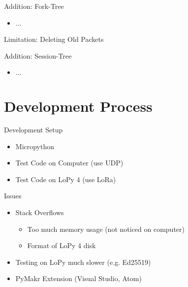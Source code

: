 \documentclass[aspectratio=169]{beamer}
\begin{document}
\begin{frame}[c]{Addition: Fork-Tree}
\begin{itemize}
    \item ...
\end{itemize}        
\end{frame}

\begin{frame}[c]{Limitation: Deleting Old Packets}
\begin{itemize}
\end{itemize}        
\end{frame}

\begin{frame}[c]{Addition: Session-Tree}
\begin{itemize}
    \item ...
\end{itemize}        
\end{frame}

\section{Development Process}

\begin{frame}[c]{Development Setup}
\begin{itemize}
    \item Micropython
    \item Test Code on Computer (use UDP)
    \item Test Code on LoPy 4 (use LoRa)
\end{itemize}        
\end{frame}

\begin{frame}[c]{Issues}
\begin{itemize}
    \item Stack Overflows
    	\begin{itemize}
	    \item Too much memory usage (not noticed on computer)
	    \item Format of LoPy 4 disk
	\end{itemize}
    \item Testing on LoPy much slower (e.g. Ed25519)
    \item PyMakr Extension (Visual Studio, Atom)
\end{itemize}        
\end{frame}
\end{document}
